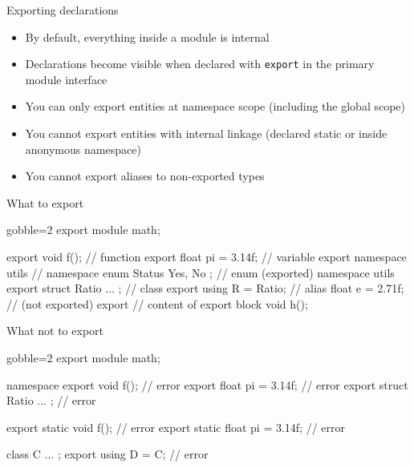\begin{frame}[fragile]
  \begin{block}{Exporting declarations}
    \begin{itemize}
      \item By default, everything inside a module is internal
      \item Declarations become visible when declared with \texttt{export} in the primary module interface
      \item You can only export entities at namespace scope (including the global scope)
      \item You cannot export entities with internal linkage (declared static or inside anonymous namespace)
      \item You cannot export aliases to non-exported types
    \end{itemize}
  \end{block}
\end{frame}

\begin{frame}[fragile]
  \begin{exampleblock}{What to export}
    \begin{cppcode*}{gobble=2}
      export module math;

      export void f();           // function
      export float pi = 3.14f;   // variable
      export namespace utils {   // namespace
        enum Status { Yes, No }; // enum (exported)
      }
      namespace utils {
        export struct Ratio { ... }; // class
        export using R = Ratio;      // alias
        float e = 2.71f;             // (not exported)
      }
      export { // content of export block
        void h();
      }
    \end{cppcode*}
  \end{exampleblock}
\end{frame}

\begin{frame}[fragile]
  \begin{alertblock}{What not to export}
    \begin{cppcode*}{gobble=2}
      export module math;

      namespace {
        export void f();              // error
        export float pi = 3.14f;      // error
        export struct Ratio { ... };  // error
      }

      export static void f();         // error
      export static float pi = 3.14f; // error

      class C { ... };
      export using D = C;             // error
    \end{cppcode*}
  \end{alertblock}
\end{frame}

